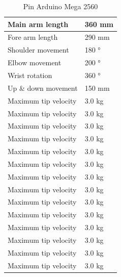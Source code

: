 \begin{table}[H]
	\centering
	\caption{Pin Arduino Mega 2560}
	
	\begin{tabular}{|l|l|}
		\hline
		Main arm length      & 360 mm		\\ \hline
		Fore arm length      & 290 mm  				\\ \hline
		Shoulder movement    & 180 °  		\\ \hline
		Elbow movement       & 200 °   		\\ \hline
		Wrist rotation       & 360 ° 		\\ \hline
		Up \& down movement  & 150 mm   				\\ \hline
		Maximum tip velocity & 3.0 kg  				\\ \hline
		Maximum tip velocity & 3.0 kg  				\\ \hline
		Maximum tip velocity & 3.0 kg  				\\ \hline
		Maximum tip velocity & 3.0 kg  				\\ \hline
		Maximum tip velocity & 3.0 kg  				\\ \hline
		Maximum tip velocity & 3.0 kg  				\\ \hline
		Maximum tip velocity & 3.0 kg  				\\ \hline
		Maximum tip velocity & 3.0 kg  				\\ \hline
		Maximum tip velocity & 3.0 kg  				\\ \hline
		Maximum tip velocity & 3.0 kg  				\\ \hline
		Maximum tip velocity & 3.0 kg  				\\ \hline
		Maximum tip velocity & 3.0 kg  				\\ \hline
		Maximum tip velocity & 3.0 kg  				\\ \hline
		Maximum tip velocity & 3.0 kg  				\\ \hline
	\end{tabular} 
\end{table}
